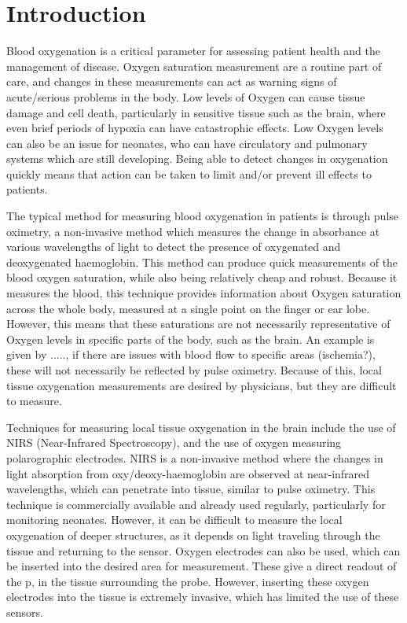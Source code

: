 \chapter{Introduction}\label{ch:intro}

Blood oxygenation is a critical parameter for assessing patient health and the management of disease.
Oxygen saturation measurement are a routine part of care, and changes in these measurements can act as warning signs of acute/serious problems in the body.
Low levels of Oxygen can cause tissue damage and cell death, particularly in sensitive tissue such as the brain, where even brief periods of
hypoxia can have catastrophic effects.
Low Oxygen levels can also be an issue for neonates, who can have circulatory and pulmonary systems which are still developing.
Being able to detect changes in oxygenation quickly means that action can be taken to limit and/or prevent ill effects to patients.

The typical method for measuring blood oxygenation in patients is through pulse oximetry, a non-invasive method which measures the change in absorbance at
various wavelengths of light to detect the presence of oxygenated and deoxygenated haemoglobin.
This method can produce quick measurements of the blood oxygen saturation, while also being relatively cheap and robust.
Because it measures the blood, this technique provides information about Oxygen saturation across the whole body, measured at a single point on the finger or ear lobe.
However, this means that these saturations are not necessarily representative of Oxygen levels in specific parts of the body, such as the brain.
An example is given by ....., if there are issues with blood flow to specific areas (ischemia?), these will not necessarily be reflected by pulse oximetry.
Because of this, local tissue oxygenation measurements are desired by physicians, but they are difficult to measure.

Techniques for measuring local tissue oxygenation in the brain include the use of NIRS (Near-Infrared Spectroscopy), and the use of oxygen measuring
polarographic electrodes.
NIRS is a non-invasive method where the changes in light absorption from oxy/deoxy-haemoglobin are observed at near-infrared wavelengths, which can penetrate
into tissue, similar to pulse oximetry.
This technique is commercially available and already used regularly, particularly for monitoring neonates.
However, it can be difficult to measure the local oxygenation of deeper structures, as it depends on light traveling through the tissue and returning to the sensor.
Oxygen electrodes can also be used, which can be inserted into the desired area for measurement.
These give a direct readout of the p\Otwo, in the tissue surrounding the probe.
However, inserting these oxygen electrodes into the tissue is extremely invasive, which has limited the use of these sensors.

